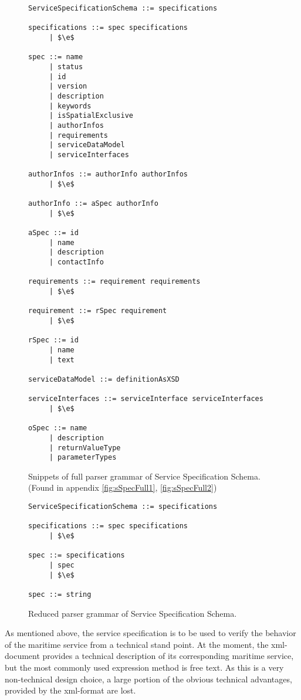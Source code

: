 \begin{figure}
	\centering
	\begin{lstlisting}[keywordstyle={}]
ServiceSpecificationSchema ::= specifications

specifications ::= spec specifications
     | $\e$
     
spec ::= name
     | status
     | id
     | version
     | description
     | keywords
     | isSpatialExclusive
     | authorInfos
     | requirements
     | serviceDataModel
     | serviceInterfaces
     
authorInfos ::= authorInfo authorInfos
     | $\e$

authorInfo ::= aSpec authorInfo
     | $\e$

aSpec ::= id
     | name
     | description
     | contactInfo

requirements ::= requirement requirements
     | $\e$

requirement ::= rSpec requirement
     | $\e$

rSpec ::= id
     | name
     | text

serviceDataModel ::= definitionAsXSD

serviceInterfaces ::= serviceInterface serviceInterfaces
     | $\e$

oSpec ::= name
     | description
     | returnValueType
     | parameterTypes
	\end{lstlisting}
	\caption{Snippets of full parser grammar of Service Specification Schema. (Found in appendix \ref{fig:sSpecFull1}, \ref{fig:sSpecFull2})}
	\label{fig:sSpecFull}
\end{figure}

\begin{figure}
	\centering
	\begin{lstlisting}[keywordstyle={}]
ServiceSpecificationSchema ::= specifications

specifications ::= spec specifications
     | $\e$
     
spec ::= specifications
     | spec
     | $\e$

spec ::= string
	\end{lstlisting}
	\caption{Reduced parser grammar of Service Specification Schema.}
	\label{fig:sSpecRed}
\end{figure}

As mentioned above, the service specification is to be used to verify the behavior of the maritime service from a technical stand point. At the moment, the xml-document provides a technical description of its corresponding maritime service, but the most commonly used expression method is free text. As this is a very non-technical design choice, a large portion of the obvious technical advantages, provided by the xml-format are lost. 


